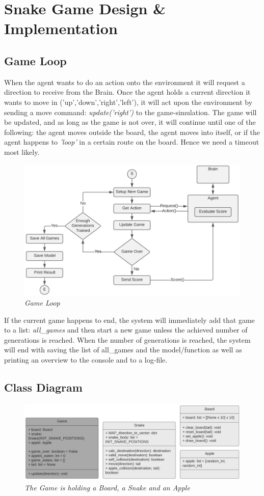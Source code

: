 \documentclass[
a4paper,
11pt,
english
]{report}
\begin{document}
\section{Snake Game Design \& Implementation}

\subsection{Game Loop}
When the agent wants to do an action onto the environment it will request a direction to receive from the Brain. Once the agent holds a current direction it wants to move in ('up','down','right','left'), it will act upon the environment by sending a move command: \textit{update('right')} to the game-simulation. The game will be updated, and as long as the game is not over, it will continue until one of the following: the agent moves outside the board, the agent moves into itself, or if the agent happens to \textit{'loop'} in a certain route on the board. Hence we need a timeout most likely.

\begin{figure}[h]
    \centering
    \includegraphics[width=.75\textwidth]{game_loop}
    \caption{\textit{Game Loop}}
    \label{fig:game_loop}
\end{figure}

If the current game happens to end, the system will immediately add that game to a list: \textit{all\_games} and then start a new game unless the achieved number of generations is reached. When the number of generations is reached, the system will end with saving the list of all\_games and the model/function as well as printing an overview to the console and to a log-file.

\subsection{Class Diagram}
\begin{figure}[h]
    \centering
    \includegraphics[width=.9\textwidth]{game_class_diagram}
    \caption{\textit{The Game is holding a Board, a Snake and an Apple}}
    \label{fig:game_class_diagram}
\end{figure}
\end{document}
